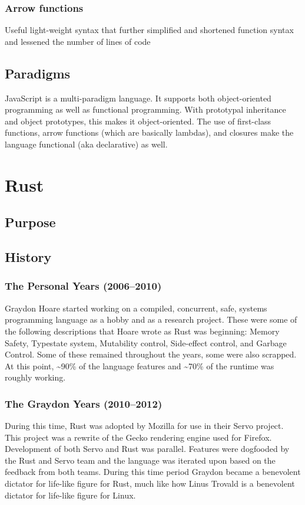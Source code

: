 \documentclass{article}
\begin{document}
  \subsubsection{Arrow functions}
  Useful light-weight syntax that further simplified and shortened function
  syntax and lessened the number of lines of code

  \subsection{Paradigms}
  JavaScript is a multi-paradigm language. It supports both object-oriented
  programming as well as functional programming. With prototypal inheritance and
  object prototypes, this makes it object-oriented. The use of first-class
  functions, arrow functions (which are basically lambdas), and closures make
  the language functional (aka declarative) as well.

  \section{Rust}

  \subsection{Purpose}
  \subsection{History}
  \subsubsection{The Personal Years (2006--2010)}
  Graydon Hoare started working on a compiled, concurrent, safe, systems
  programming language as a hobby and as a research project. These were some of
  the following descriptions that Hoare wrote as Rust was beginning: Memory
  Safety, Typestate system, Mutability control, Side-effect control, and Garbage
  Control. Some of these remained throughout the years, some were also scrapped.
  At this point, \textasciitilde90\% of the language features and
  \textasciitilde70\% of the runtime was roughly working.

  \subsubsection{The Graydon Years (2010--2012)}
  During this time, Rust was adopted by Mozilla for use in their Servo project.
  This project was a rewrite of the Gecko rendering engine used for Firefox.
  Development of both Servo and Rust was parallel. Features were dogfooded by
  the Rust and Servo team and the language was iterated upon based on the
  feedback from both teams. During this time period Graydon became a benevolent
  dictator for life-like figure for Rust, much like how Linus Trovald is a
  benevolent dictator for life-like figure for Linux.
\end{document}
